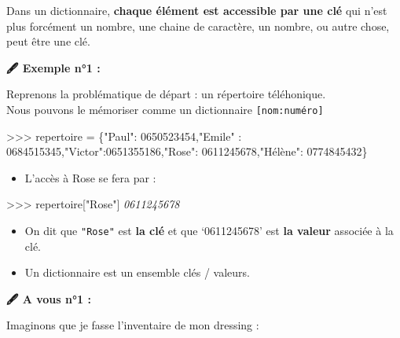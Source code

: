 \documentclass[
]{article}
\newenvironment{Shaded}{}{}
\newcommand{\CommentTok}[1]{\textcolor[rgb]{0.38,0.63,0.69}{\textit{#1}}}
\newcommand{\NormalTok}[1]{#1}
\newcommand{\OperatorTok}[1]{\textcolor[rgb]{0.40,0.40,0.40}{#1}}
\newcommand{\StringTok}[1]{\textcolor[rgb]{0.25,0.44,0.63}{#1}}
\providecommand{\tightlist}{%
  \setlength{\itemsep}{0pt}\setlength{\parskip}{0pt}}
\begin{document}
Dans un dictionnaire, \textbf{chaque élément est accessible par une clé}
qui n'est plus forcément un nombre, une chaine de caractère, un nombre,
ou autre chose, peut être une clé.

\textbf{🖋 Exemple n°1 :}

Reprenons la problématique de départ : un répertoire téléhonique.\\
Nous pouvons le mémoriser comme un dictionnaire
\texttt{{[}nom:numéro{]}}

\begin{Shaded}
\begin{Highlighting}[]
\OperatorTok{\textgreater{}\textgreater{}\textgreater{}}\NormalTok{ repertoire }\OperatorTok{=}\NormalTok{ \{}\StringTok{"Paul"}\NormalTok{: }\StringTok{\textquotesingle{}0650523454\textquotesingle{}}\NormalTok{,}\StringTok{"Emile"}\NormalTok{ : }\StringTok{\textquotesingle{}0684515345\textquotesingle{}}\NormalTok{,}\StringTok{"Victor"}\NormalTok{:}\StringTok{\textquotesingle{}0651355186\textquotesingle{}}\NormalTok{,}\StringTok{"Rose"}\NormalTok{: }\StringTok{\textquotesingle{}0611245678\textquotesingle{}}\NormalTok{,}\StringTok{"Hélène"}\NormalTok{: }\StringTok{\textquotesingle{}0774845432\textquotesingle{}}\NormalTok{\}}
\end{Highlighting}
\end{Shaded}

\begin{itemize}
\tightlist
\item
  L'accès à Rose se fera par :
\end{itemize}

\begin{Shaded}
\begin{Highlighting}[]
\OperatorTok{\textgreater{}\textgreater{}\textgreater{}}\NormalTok{ repertoire[}\StringTok{"Rose"}\NormalTok{]}
\CommentTok{\textquotesingle{}0611245678\textquotesingle{}}
\end{Highlighting}
\end{Shaded}

\begin{itemize}
\item
  On dit que \texttt{"Rose"} est \textbf{la clé} et que `0611245678' est
  \textbf{la valeur} associée à la clé.
\item
  Un dictionnaire est un ensemble clés / valeurs.
\end{itemize}

\textbf{🖋 A vous n°1 :}

Imaginons que je fasse l'inventaire de mon dressing :
\end{document}
